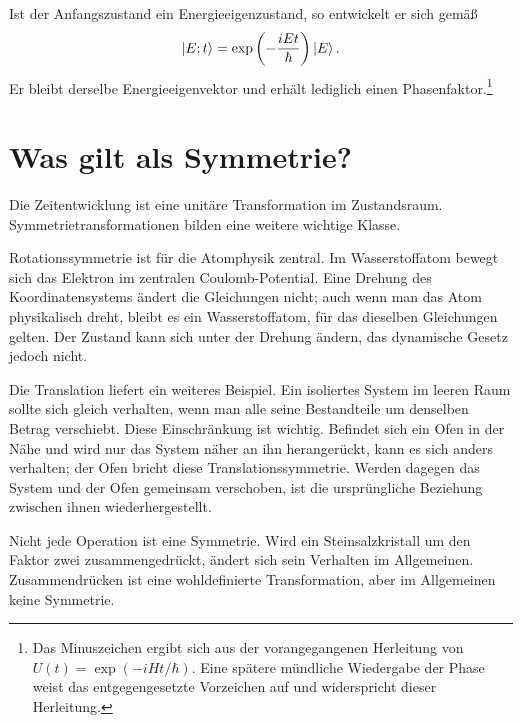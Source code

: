 Ist der Anfangszustand ein Energieeigenzustand, so entwickelt er sich gemäß
\begin{equation}
\left\lvert E;t\right\rangle
=
\exp\left(-\frac{iEt}{\hbar}\right)\left\lvert E\right\rangle.
\end{equation}
Er bleibt derselbe Energieeigenvektor und erhält lediglich einen Phasenfaktor.\footnote{Das Minuszeichen ergibt sich aus der vorangegangenen Herleitung von \(U(t)=\exp(-iHt/\hbar)\). Eine spätere mündliche Wiedergabe der Phase weist das entgegengesetzte Vorzeichen auf und widerspricht dieser Herleitung.}

\begin{classroomqa}
\end{classroomqa}

\section{Was gilt als Symmetrie?}

Die Zeitentwicklung ist eine unitäre Transformation im Zustandsraum. Symmetrietransformationen bilden eine weitere wichtige Klasse.

Rotationssymmetrie ist für die Atomphysik zentral. Im Wasserstoffatom bewegt sich das Elektron im zentralen Coulomb-Potential. Eine Drehung des Koordinatensystems ändert die Gleichungen nicht; auch wenn man das Atom physikalisch dreht, bleibt es ein Wasserstoffatom, für das dieselben Gleichungen gelten. Der Zustand kann sich unter der Drehung ändern, das dynamische Gesetz jedoch nicht.

Die Translation liefert ein weiteres Beispiel. Ein isoliertes System im leeren Raum sollte sich gleich verhalten, wenn man alle seine Bestandteile um denselben Betrag verschiebt. Diese Einschränkung ist wichtig. Befindet sich ein Ofen in der Nähe und wird nur das System näher an ihn herangerückt, kann es sich anders verhalten; der Ofen bricht diese Translationssymmetrie. Werden dagegen das System und der Ofen gemeinsam verschoben, ist die ursprüngliche Beziehung zwischen ihnen wiederhergestellt.

Nicht jede Operation ist eine Symmetrie. Wird ein Steinsalzkristall um den Faktor zwei zusammengedrückt, ändert sich sein Verhalten im Allgemeinen. Zusammendrücken ist eine wohldefinierte Transformation, aber im Allgemeinen keine Symmetrie.

